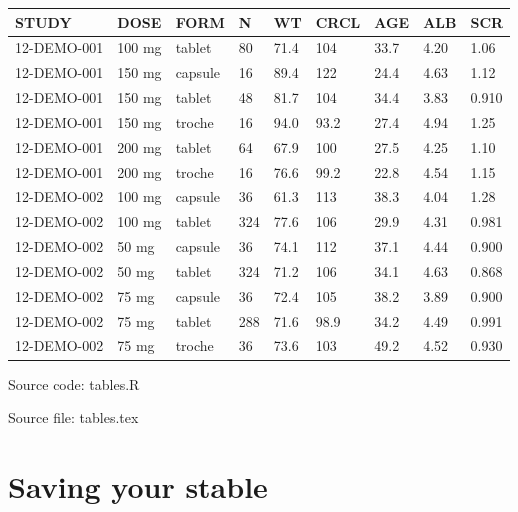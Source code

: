 \documentclass[
]{book}
\begin{document}
\begin{table}[H]
\centering
\setlength{\tabcolsep}{5pt} 
\begin{threeparttable}
\renewcommand{\arraystretch}{1.3}
\begin{tabular}[h]{lllllllll}
\hline
STUDY & DOSE & FORM & N & WT & CRCL & AGE & ALB & SCR \\
\hline
12-DEMO-001 & 100 mg & tablet & 80 & 71.4 & 104 & 33.7 & 4.20 & 1.06 \\
12-DEMO-001 & 150 mg & capsule & 16 & 89.4 & 122 & 24.4 & 4.63 & 1.12 \\
12-DEMO-001 & 150 mg & tablet & 48 & 81.7 & 104 & 34.4 & 3.83 & 0.910 \\
12-DEMO-001 & 150 mg & troche & 16 & 94.0 & 93.2 & 27.4 & 4.94 & 1.25 \\
12-DEMO-001 & 200 mg & tablet & 64 & 67.9 & 100 & 27.5 & 4.25 & 1.10 \\
12-DEMO-001 & 200 mg & troche & 16 & 76.6 & 99.2 & 22.8 & 4.54 & 1.15 \\
12-DEMO-002 & 100 mg & capsule & 36 & 61.3 & 113 & 38.3 & 4.04 & 1.28 \\
12-DEMO-002 & 100 mg & tablet & 324 & 77.6 & 106 & 29.9 & 4.31 & 0.981 \\
12-DEMO-002 & 50 mg & capsule & 36 & 74.1 & 112 & 37.1 & 4.44 & 0.900 \\
12-DEMO-002 & 50 mg & tablet & 324 & 71.2 & 106 & 34.1 & 4.63 & 0.868 \\
12-DEMO-002 & 75 mg & capsule & 36 & 72.4 & 105 & 38.2 & 3.89 & 0.900 \\
12-DEMO-002 & 75 mg & tablet & 288 & 71.6 & 98.9 & 34.2 & 4.49 & 0.991 \\
12-DEMO-002 & 75 mg & troche & 36 & 73.6 & 103 & 49.2 & 4.52 & 0.930 \\
\hline
\end{tabular}
\begin{tablenotes}[flushleft]
\item Source code: tables.R
\item Source file: tables.tex
\end{tablenotes}
\end{threeparttable}
\end{table}

\hypertarget{saving-your-stable}{%
\section{Saving your stable}\label{saving-your-stable}}
\end{document}
